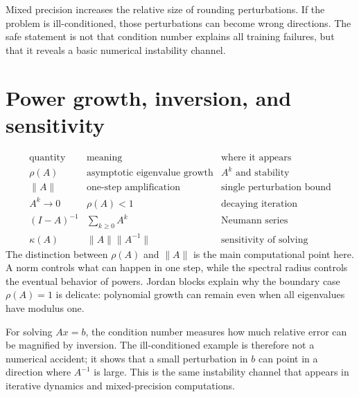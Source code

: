 Mixed precision increases the relative size of rounding perturbations.  If the problem is ill-conditioned, those perturbations can become wrong directions.  The safe statement is not that condition number explains all training failures, but that it reveals a basic numerical instability channel.

\section{Power growth, inversion, and sensitivity}

\[
\begin{array}{c|c|c}
\text{quantity} & \text{meaning} & \text{where it appears}\\
\hline
\rho(A) & \text{asymptotic eigenvalue growth} & A^k\text{ and stability}\\
\|A\| & \text{one-step amplification} & \text{single perturbation bound}\\
A^k\to0 & \rho(A)<1 & \text{decaying iteration}\\
(I-A)^{-1} & \sum_{k\ge0}A^k & \text{Neumann series}\\
\kappa(A) & \|A\|\|A^{-1}\| & \text{sensitivity of solving}
\end{array}
\]
The distinction between \(\rho(A)\) and \(\|A\|\) is the main computational point here.  A norm controls what can happen in one step, while the spectral radius controls the eventual behavior of powers.  Jordan blocks explain why the boundary case \(\rho(A)=1\) is delicate: polynomial growth can remain even when all eigenvalues have modulus one.

For solving \(Ax=b\), the condition number measures how much relative error can be magnified by inversion.  The ill-conditioned example is therefore not a numerical accident; it shows that a small perturbation in \(b\) can point in a direction where \(A^{-1}\) is large.  This is the same instability channel that appears in iterative dynamics and mixed-precision computations.
